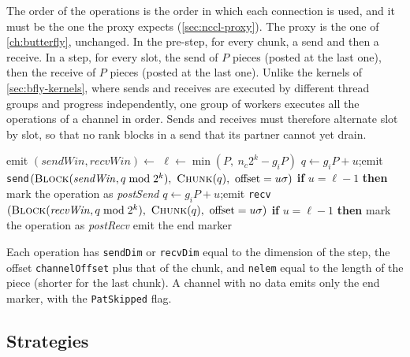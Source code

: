 The order of the operations is the order in which each connection is used, and it must be the one the proxy expects (\cref{sec:nccl-proxy}). The proxy is the one of \cref{ch:butterfly}, unchanged.
In the pre-step, for every chunk, a send and then a receive. In a step, for every slot, the send of $P$ pieces (posted at the last one), then the receive of $P$ pieces (posted at the last one).
Unlike the kernels of \cref{sec:bfly-kernels}, where sends and receives are executed by different thread groups and progress independently, one group of workers executes all the operations of a channel in order.
Sends and receives must therefore alternate slot by slot, so that no rank blocks in a send that its partner cannot yet drain.

\begin{algorithm}[t]
\caption{Operations emitted by the schedule thread (common structure of the four strategies).}
\label{alg:pat-gen}
\begin{algorithmic}[1]
  \State emit 
\EndFor
{}
  \State $(\mathit{sendWin},\mathit{recvWin})\gets$  
    \State $\ell\gets\min(P,\ n_c2^k-g_iP)$
      \State $q\gets g_iP+u$;\quad emit \texttt{send}$(\textsc{Block}(\mathit{sendWin},q\bmod2^k),\ \textsc{Chunk}(q),\ \text{offset}=u\sigma)$
      \State \textbf{if} $u=\ell-1$ \textbf{then} mark the operation as \emph{postSend}
    \EndFor
      \State $q\gets g_iP+u$;\quad emit \texttt{recv}$(\textsc{Block}(\mathit{recvWin},q\bmod2^k),\ \textsc{Chunk}(q),\ \text{offset}=u\sigma)$
      \State \textbf{if} $u=\ell-1$ \textbf{then} mark the operation as \emph{postRecv}
    \EndFor
  \EndFor
\EndFor
\State emit the end marker 
\end{algorithmic}
\end{algorithm}

Each operation has \texttt{sendDim} or \texttt{recvDim} equal to the dimension of the step, the offset \texttt{channelOffset} plus that of the chunk, and \texttt{nelem} equal to the length of the piece (shorter for the last chunk).
A channel with no data emits only the end marker, with the \texttt{PatSkipped} flag.

\subsection{Strategies}\label{sec:pat-strategies}

